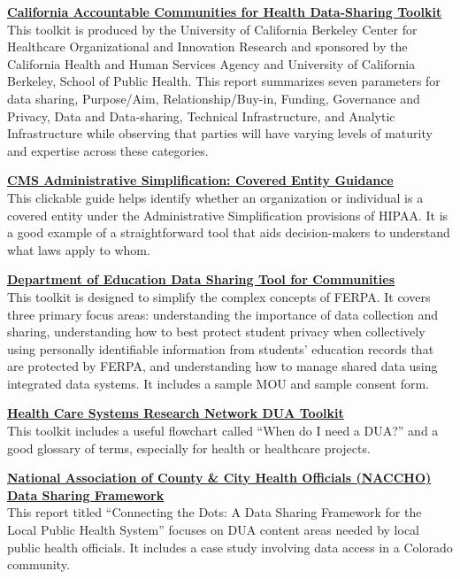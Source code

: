 \documentclass[
]{book}
\begin{document}
\textbf{\href{https://cachi.org/uploads/resources/ACH-Data-Sharing-Toolkit-December-2016.pdf}{California Accountable Communities for Health Data-Sharing Toolkit}}\\
This toolkit is produced by the University of California Berkeley Center for Healthcare Organizational and Innovation Research and sponsored by the California Health and Human Services Agency and University of California Berkeley, School of Public Health. This report summarizes seven parameters for data sharing, Purpose/Aim, Relationship/Buy-in, Funding, Governance and Privacy, Data and Data-sharing, Technical Infrastructure, and Analytic Infrastructure while observing that parties will have varying levels of maturity and expertise across these categories.

\textbf{\href{https://www.cms.gov/Regulations-and-Guidance/Administrative-Simplification/HIPAA-ACA/Downloads/CoveredEntitiesChart20160617.pdf}{CMS Administrative Simplification: Covered Entity Guidance}}\\
This clickable guide helps identify whether an organization or individual is a covered entity under the Administrative Simplification provisions of HIPAA. It is a good example of a straightforward tool that aids decision-makers to understand what laws apply to whom.

\textbf{\href{https://www2.ed.gov/programs/promiseneighborhoods/datasharingtool.pdf}{Department of Education Data Sharing Tool for Communities}}\\
This toolkit is designed to simplify the complex concepts of FERPA. It covers three primary focus areas: understanding the importance of data collection and sharing, understanding how to best protect student privacy when collectively using personally identifiable information from students' education records that are protected by FERPA, and understanding how to manage shared data using integrated data systems. It includes a sample MOU and sample consent form.

\textbf{\href{http://www.hcsrn.org/asset/ce41ec1a-c071-4300-ac07-14cd653f234C/HCSRN_DUAToolkit.pdf}{Health Care Systems Research Network DUA Toolkit}}\\
This toolkit includes a useful flowchart called ``When do I need a DUA?'' and a good glossary of terms, especially for health or healthcare projects.

\textbf{\href{https://www.naccho.org/uploads/downloadable-resources/Issue-Brief-Data-Sharing-Framework-NA592.pdf}{National Association of County \& City Health Officials (NACCHO) Data Sharing Framework}}\\
This report titled ``Connecting the Dots: A Data Sharing Framework for the Local Public Health System'' focuses on DUA content areas needed by local public health officials. It includes a case study involving data access in a Colorado community.
\end{document}
